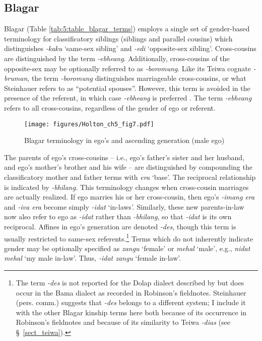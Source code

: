 \clearpage
\subsection{Blagar}\label{sect_blagar}
Blagar (Table \ref{tab:5:table_blagar_terms}) employs a single set of gender-based terminology for classificatory siblings (siblings and parallel cousins) which distinguishes \textit{-kaku} `same-sex sibling' and \textit{-edi} `opposite-sex sibling'. Cross-cousins are distinguished by the term \textit{-ebheang}. Additionally, cross-cousins of the opposite-sex may be optionally referred to as \textit{-boromung}. Like its Teiwa cognate \textit{-bruman}, the term \textit{-boromung} distinguishes marriageable cross-cousins, or what Steinhauer refers to as ``potential spouses''. However, this term is avoided in the presence of the referent, in which case \textit{-ebheang} is preferred \citep[156]{Steinhauer1993}. The term \textit{-ebheang} refers to all cross-cousins, regardless of the gender of ego or referent.


\begin{figure}[h]
\texttt{[image: figures/Holton\_ch5\_fig7.pdf]}
\caption{Blagar terminology in ego's and ascending generation (male ego) }
\label{fig:5:7}
\end{figure}  
 

 

The parents of ego's cross-cousins -- i.e., ego's father's sister and her husband, and ego's mother's brother and his wife -- are distinguished by compounding the classificatory mother and father terms with \textit{era} `base'. The reciprocal relationship is indicated by \textit{-bhilang.} This terminology changes when cross-cousin marriages are actually realized. If ego marries his or her cross-cousin, then ego's \textit{-imang era} and \textit{-iva era} become simply \textit{-idat} `in-laws'. Similarly, these new parents-in-law now also refer to ego as \textit{-idat} rather than \textit{-bhilang}, so that \textit{-idat} is its own reciprocal. Affines in ego's generation are denoted \textit{-des}, though this term is usually restricted to same-sex referents.\footnote{The term \textit{-des} is not reported for the Dolap dialect described by \citet{Steinhauer1993} but does occur in the Bama dialect as recorded in Robinson's fieldnotes. Steinhauer (pers. comm.) suggests that \textit{-des} belongs to a different system; I include it with the other Blagar kinship terms here both because of its occurrence in Robinson's fieldnotes and because of its similarity to Teiwa \textit{-dias} (see {\S}~\ref{sect_teiwa}).} Terms which do not inherently indicate gender may be optionally specified as \textit{zangu} `female' or \textit{mehal} `male', e.g., \textit{nidat mehal} `my male in-law'. Thus, \textit{-idat zangu} `female in-law'. 


